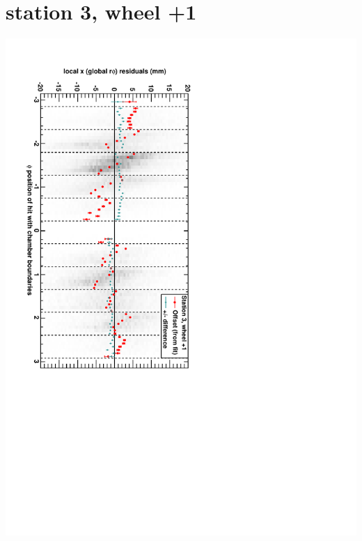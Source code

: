 \documentclass[compress]{beamer}
\begin{document}
\section*{station 3, wheel +1}
\begin{frame} \vfill \mbox{\hspace{-1 cm}\includegraphics[height=1.2\linewidth, angle=90]{DTrphiVsPhi_st3_whD.pdf}} \end{frame}
\end{document}
